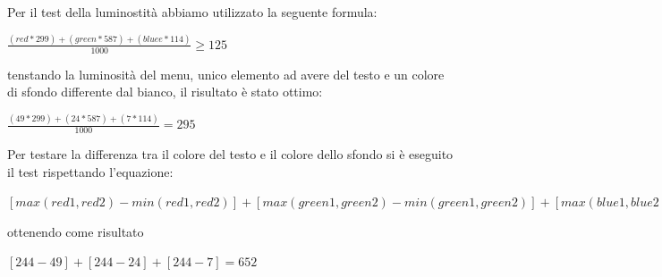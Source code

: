 \documentclass[a4paper,12pt,hidelinks]{report}
\begin{document}
Per il test della luminostità abbiamo utilizzato la seguente formula:
\begin{center}
$\frac{(red*299)+(green*587)+(bluee*114)}{1000} \geq {125}$
\end{center}

tenstando la luminosità del menu, unico elemento ad avere del testo e un colore di sfondo differente dal bianco, il risultato è stato ottimo:
\\[1cm]
\begin{center}
$\frac{(49*299)+(24*587)+(7*114)}{1000} = 295$
\end{center}

Per testare la differenza tra il colore del testo e il colore dello sfondo si è eseguito il test rispettando l'equazione:
\begin{center}
$[max(red1,red2)-min(red1,red2)]+[max(green1,green2)-min(green1,green2)]+[max(blue1,blue2)-min(blue1,blue2)]\geq{500}$
\end{center}
ottenendo come risultato
\begin{center}
$[244-49]+[244-24]+[244-7]={652}$
\end{center}
\end{document}
